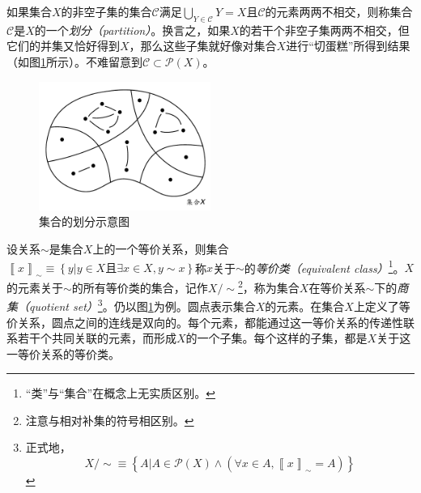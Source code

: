 \documentclass[../main.tex]{subfiles}
\begin{document}
如果集合$X$的非空子集的集合$\mathcal{C}$满足$\bigcup_{Y\in\mathcal{C}}Y=X$且$\mathcal{C}$的元素两两不相交，则称集合$\mathcal{C}$是$X$的一个\emph{划分（partition）}。换言之，如果$X$的若干个非空子集两两不相交，但它们的并集又恰好得到$X$，那么这些子集就好像对集合$X$进行“切蛋糕”所得到结果（如图\ref{fig:II.1.2}所示）。不难留意到$\mathcal{C}\subset\mathcal{P}\left(X\right)$。

\begin{figure}[htbp]
    \centering
    \includegraphics[width=0.5\textwidth]{../images/partition.pdf}
    \caption{集合的划分示意图}
    \label{fig:II.1.2}
\end{figure}

设关系$\sim$是集合$X$上的一个等价关系，则集合$\left\llbracket x\right\rrbracket_\sim\equiv\left\{y|y\in X\text{且}\exists x\in X,y\sim x\right\}$称$x$关于$\sim$的\emph{等价类（equivalent class）}\footnote{“类”与“集合”在概念上无实质区别。}。$X$的元素关于$\sim$的所有等价类的集合，记作$X/\sim$\footnote{注意与相对补集的符号相区别。}，称为集合$X$在等价关系$\sim$下的\emph{商集（quotient set）}\footnote{正式地，
    \[
        X/\sim\equiv\left\{A|A\in\mathcal{P}\left(X\right)\wedge\left(\forall x\in A,\left\llbracket x\right\rrbracket_\sim = A\right)\right\}
    \]
}。仍以图\ref{fig:II.1.2}为例。圆点表示集合$X$的元素。在集合$X$上定义了等价关系，圆点之间的连线是双向的。每个元素，都能通过这一等价关系的传递性联系若干个共同关联的元素，而形成$X$的一个子集。每个这样的子集，都是$X$关于这一等价关系的等价类。
\end{document}
